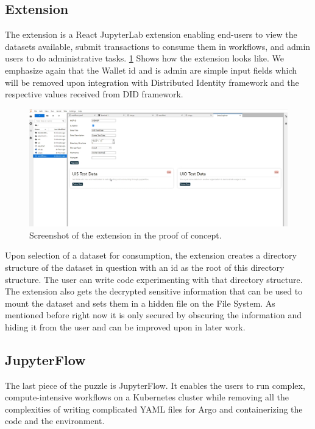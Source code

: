 \subsection{Extension}
The extension is a React JupyterLab extension enabling end-users to view the datasets available, submit transactions to consume them in workflows, and admin users to do administrative tasks. \ref{fig:extension} Shows how the extension looks like. We emphasize again that the Wallet id and is admin are simple input fields which will be removed upon integration with Distributed Identity framework and the respective values received from DID framework.

\begin{figure}
    \centering
    \includegraphics[width=14cm,keepaspectratio]{photos/Extension Screenshot.png}
    \caption{Screenshot of the extension in the proof of concept.}
    \label{fig:extension}
\end{figure}

\bigskip
Upon selection of a dataset for consumption, the extension creates a directory structure of the dataset in question with an id as the root of this directory structure. The user can write code experimenting with that directory structure. The extension also gets the decrypted sensitive information that can be used to mount the dataset and sets them in a hidden file on the File System. As mentioned before right now it is only secured by obscuring the information and hiding it from the user and can be improved upon in later work.

\subsection{JupyterFlow}
The last piece of the puzzle is JupyterFlow. It enables the users to run complex, compute-intensive workflows on a Kubernetes cluster while removing all the complexities of writing complicated YAML files for Argo and containerizing the code and the environment. 

